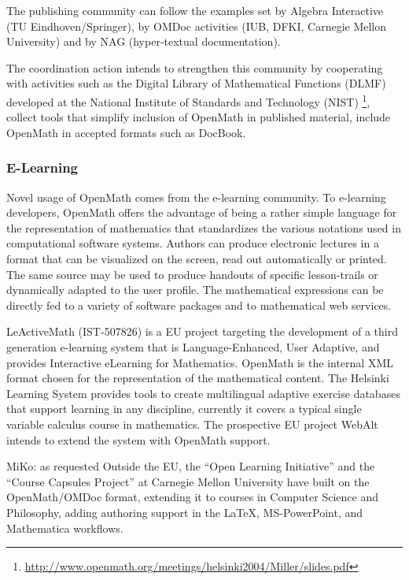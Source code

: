 \documentclass{euproposal}
\begin{document}
The publishing community can follow the examples set by Algebra
Interactive (TU Eindhoven/Springer), by OMDoc activities (IUB, DFKI,
Carnegie Mellon University) and by NAG (hyper-textual documentation).

The coordination action intends to strengthen this community by
cooperating with activities such as the Digital Library of
Mathematical Functions (DLMF) developed at the National Institute of
Standards and Technology (NIST)
\footnote{\url{http://www.openmath.org/meetings/helsinki2004/Miller/slides.pdf}},
collect tools that simplify inclusion of OpenMath in published
material, include OpenMath in accepted formats such as DocBook.



\subsubsection{E-Learning}\label{sec:e-learn}
Novel usage of OpenMath comes from the e-learning community. To
e-learning developers, OpenMath offers the advantage of being a rather
simple language for the representation of mathematics that
standardizes the various notations used in computational software
systems. Authors can produce electronic lectures in a format that can
be visualized on the screen, read out automatically or printed. The
same source may be used to produce handouts of specific lesson-trails
or dynamically adapted to the user profile. The mathematical
expressions can be directly fed to a variety of software packages and
to mathematical web services.

LeActiveMath (IST-507826) is a EU project targeting the development of
a third generation e-learning system that is Language-Enhanced, User
Adaptive, and provides Interactive eLearning for Mathematics. OpenMath
is the internal XML format chosen for the representation of the
mathematical content.  The Helsinki Learning System provides tools to
create multilingual adaptive exercise databases that support learning
in any discipline, currently it covers a typical single variable
calculus course in mathematics. The prospective EU project WebAlt
intends to extend the system with OpenMath support.

\begin{newpart}{MiKo: as requested}
  Outside the EU, the ``Open Learning Initiative'' and the ``Course Capsules
  Project'' at Carnegie Mellon University have built on the OpenMath/OMDoc format,
  extending it to courses in Computer Science and Philosophy, adding authoring
  support in the {\LaTeX}, MS-PowerPoint, and Mathematica workflows.
\end{newpart}
\end{document}
